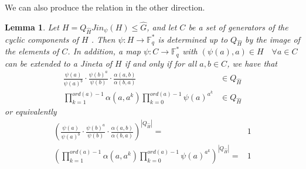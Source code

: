 \documentclass{article}
\newtheorem{lemma}[theorem]{Lemma}
\begin{document}
We can also produce the relation in the other direction.
\begin{lemma} \label{JinetaExtender}
    Let $H=Q_{\hat{H}} Jin_\psi(H) \leq \hat{G}$, and let $C$ be a set of generators of the cyclic components of $H$ . Then $\psi:H \longrightarrow \mathbb{F}_q^*$ is determined up to $Q_{\hat{H}}$ by the image of the elements of $C$. In addition, a map $\psi: C \longrightarrow \mathbb{F}_q^*$ with $(\psi(a),a)\in H   \quad \forall a\in C$ can be extended to a Jineta of $H$ if and only if for all $a,b\in C$, we have that
    \begin{align} 
        \frac{\psi(a)}{\psi(a)^b} \cdot \frac{\psi(b)^a}{\psi(b)} \cdot \frac{\alpha(a,b)}{\alpha(b,a)}& \in Q_{\hat{H}} \\
       \prod_{k=1}^{ord(a)-1}\alpha(a,a^k) \prod_{k=0}^{ord(a)-1} \psi(a)^{a^k}& \in Q_{\hat{H}} 
    \end{align}
    or equivalently
        \begin{align} \label{EqDef}
        \left(\frac{\psi(a)}{\psi(a)^b} \cdot \frac{\psi(b)^a}{\psi(b)} \cdot \frac{\alpha(a,b)}{\alpha(b,a)} \right) ^ { |Q_{\hat{H}}|} =& 1 \\
       \left(\prod_{k=1}^{ord(a)-1}\alpha(a,a^k) \prod_{k=0}^{ord(a)-1} \psi(a)^{a^k}\right) ^ { |Q_{\hat{H}}|} =&  1 
    \end{align}
\end{lemma}
\end{document}
